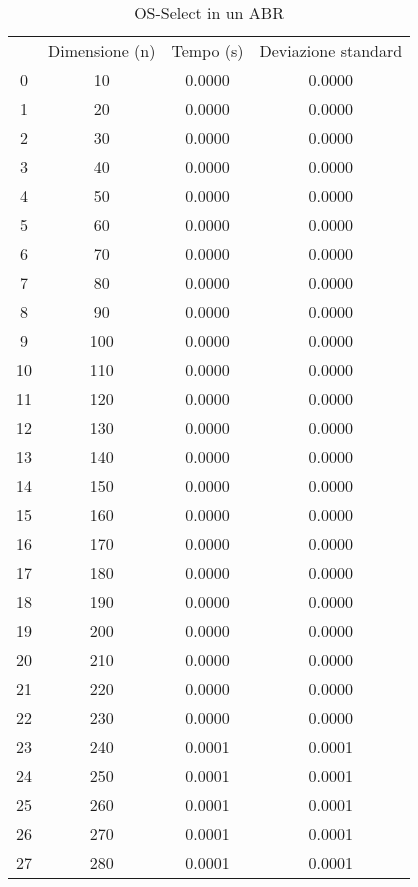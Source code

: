 \begin{table}
\centering
\caption{OS-Select in un ABR}
\label{OS-Select in un ABR}
\begin{adjustbox}{width=1\textwidth/2}
\begin{tabular}{|c|c|c|c|}
\hline
 & Dimensione (n) & Tempo (s) & Deviazione standard \\
0 & 10 & 0.0000 & 0.0000 \\
\cline{1-4}
1 & 20 & 0.0000 & 0.0000 \\
\cline{1-4}
2 & 30 & 0.0000 & 0.0000 \\
\cline{1-4}
3 & 40 & 0.0000 & 0.0000 \\
\cline{1-4}
4 & 50 & 0.0000 & 0.0000 \\
\cline{1-4}
5 & 60 & 0.0000 & 0.0000 \\
\cline{1-4}
6 & 70 & 0.0000 & 0.0000 \\
\cline{1-4}
7 & 80 & 0.0000 & 0.0000 \\
\cline{1-4}
8 & 90 & 0.0000 & 0.0000 \\
\cline{1-4}
9 & 100 & 0.0000 & 0.0000 \\
\cline{1-4}
10 & 110 & 0.0000 & 0.0000 \\
\cline{1-4}
11 & 120 & 0.0000 & 0.0000 \\
\cline{1-4}
12 & 130 & 0.0000 & 0.0000 \\
\cline{1-4}
13 & 140 & 0.0000 & 0.0000 \\
\cline{1-4}
14 & 150 & 0.0000 & 0.0000 \\
\cline{1-4}
15 & 160 & 0.0000 & 0.0000 \\
\cline{1-4}
16 & 170 & 0.0000 & 0.0000 \\
\cline{1-4}
17 & 180 & 0.0000 & 0.0000 \\
\cline{1-4}
18 & 190 & 0.0000 & 0.0000 \\
\cline{1-4}
19 & 200 & 0.0000 & 0.0000 \\
\cline{1-4}
20 & 210 & 0.0000 & 0.0000 \\
\cline{1-4}
21 & 220 & 0.0000 & 0.0000 \\
\cline{1-4}
22 & 230 & 0.0000 & 0.0000 \\
\cline{1-4}
23 & 240 & 0.0001 & 0.0001 \\
\cline{1-4}
24 & 250 & 0.0001 & 0.0001 \\
\cline{1-4}
25 & 260 & 0.0001 & 0.0001 \\
\cline{1-4}
26 & 270 & 0.0001 & 0.0001 \\
\cline{1-4}
27 & 280 & 0.0001 & 0.0001 \\

\end{tabular}
\end{adjustbox}
\end{table}
